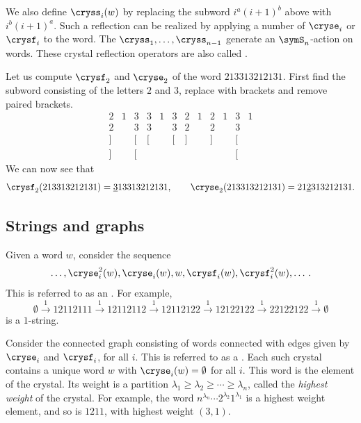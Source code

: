 We also define \label{crystalReflection}
$\cryss_i(w)$ by
replacing the subword $i^a (i+1)^b$ above with $i^b (i+1)^a$.
Such a reflection can be realized by applying a number of $\cryse_i$ or $\crysf_i$ to the word.
The \label{crystalReflectionOperator}
$\cryss_1,\dotsc,\cryss_{n-1}$ generate an $\symS_n$-action on words.
These crystal reflection operators are also called
\label{lascouxSchutzenbergerInvolution}.


\begin{example}
Let us compute $\crysf_2$ and $\cryse_2$ of the word $213313212131$.
First find the subword consisting of the letters $2$ and $3$,
replace with brackets and remove paired brackets.
\[
\begin{matrix}
2&1&3&3&1&3&2&1&2&1&3&1 \\
2& &3&3& &3&2& &2& &3&  \\
]& &[&[& &[&]& &]& &[&  \\
]& &[& & & & & & & &[& 
\end{matrix}
\]
We can now see that
\[
 \crysf_2(213313212131) = \underline{3}13313212131, \qquad \cryse_2(213313212131) = 21\underline{2}313212131.
\]
\end{example}



\subsection[crystalGraphs]{Strings and graphs}

Given a word $w$, consider the sequence
\[
  \dotsc, \cryse^2_i(w), \cryse_i(w), w,
  \crysf_i(w), \crysf^2_i(w),\dotsc .
\]
This is referred to as an \label{crystalIString}.
For example,
\[
\emptyset \overset{1}{\rightarrow}
12112111 \overset{1}{\rightarrow}
12112112 \overset{1}{\rightarrow}
12112122 \overset{1}{\rightarrow}
12122122 \overset{1}{\rightarrow}
22122122 \overset{1}{\rightarrow} \emptyset
\]
is a $1$-string.


Consider the connected graph consisting of words connected with edges given by
$\cryse_i$ and $\crysf_i$, for all $i$.
This is referred to as a .
Each such crystal contains a unique word $w$ with $\cryse_i(w)=\emptyset$
for all $i$.  This word is the \label{crystalHighestWeight}
element of the crystal.  Its weight is a partition
$\lambda_1 \geq \lambda_2 \geq \dotsb \geq \lambda_n$, called the
\emph{highest weight} of the crystal.  For example, the word
$n^{\lambda_n} \dotsm 2^{\lambda_2} 1^{\lambda_1}$ is a highest weight
element, and so is $1211$, with highest weight $(3,1)$.


